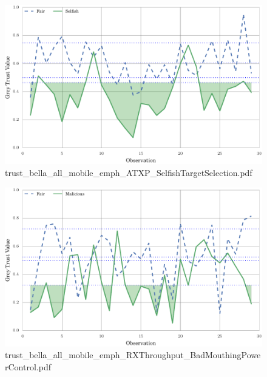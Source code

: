 \documentclass{article}
\begin{document}
\begin{figure}[h!]
\centering
\includegraphics[width=\linewidth]{trust_bella_all_mobile_emph_ATXP_SelfishTargetSelection.pdf}
\caption{trust\_bella\_all\_mobile\_emph\_ATXP\_SelfishTargetSelection.pdf}
\end{figure}




\begin{figure}[h!]
\centering
\includegraphics[width=\linewidth]{trust_bella_all_mobile_emph_RXThroughput_BadMouthingPowerControl.pdf}
\caption{trust\_bella\_all\_mobile\_emph\_RXThroughput\_BadMouthingPowerControl.pdf}
\end{figure}
\end{document}

